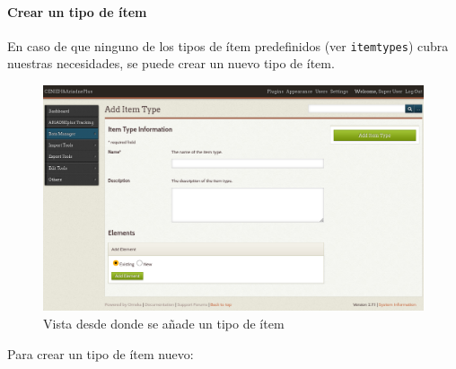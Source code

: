 \documentclass[
]{article}
\begin{document}
\hypertarget{crear-un-tipo-de-uxedtem}{%
\paragraph{Crear un tipo de ítem}\label{crear-un-tipo-de-uxedtem}}

En caso de que ninguno de los tipos de ítem predefinidos (ver
\texttt{itemtypes}) cubra nuestras necesidades, se puede crear un nuevo
tipo de ítem.

\begin{figure}
\hypertarget{add-item-type}{%
\centering
\includegraphics{../_static/images/add-item-type.png}
\caption{Vista desde donde se añade un tipo de
ítem}\label{add-item-type}
}
\end{figure}

Para crear un tipo de ítem nuevo:
\end{document}
